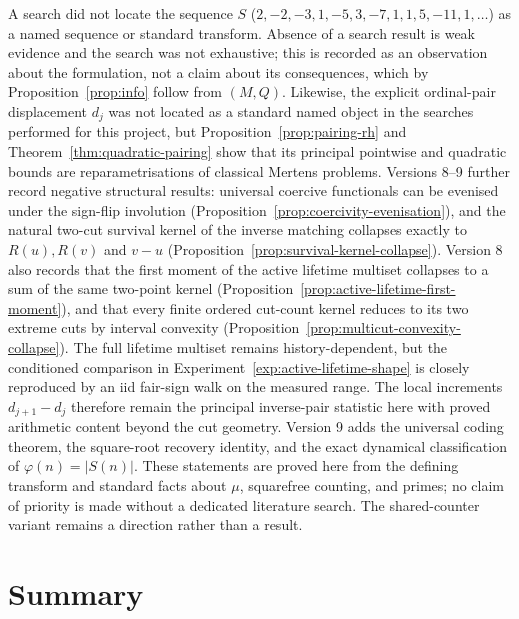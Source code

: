 \documentclass[11pt]{amsart}
\numberwithin{equation}{section}
\theoremstyle{plain}
\theoremstyle{definition}
\theoremstyle{remark}
\newcommand{\Mert}{M}
\newcommand{\Sq}{Q}
\begin{document}
A search did not locate the sequence $S$
($2,-2,-3,1,-5,3,-7,1,1,5,-11,1,\dots$) as a named sequence or standard
transform. Absence of a search result is weak evidence and the search was not
exhaustive; this is recorded as an observation about the formulation, not a
claim about its consequences, which by Proposition~\ref{prop:info} follow from
$(\Mert,\Sq)$.  Likewise, the explicit ordinal-pair displacement $d_j$ was not
located as a standard named object in the searches performed for this project,
but Proposition~\ref{prop:pairing-rh} and Theorem~\ref{thm:quadratic-pairing}
show that its principal pointwise and quadratic bounds are reparametrisations of
classical Mertens problems.  Versions 8--9 further record negative structural
results: universal coercive functionals can be evenised under the sign-flip
involution (Proposition~\ref{prop:coercivity-evenisation}), and the natural
two-cut survival kernel of the inverse matching collapses exactly to
$R(u),R(v)$ and $v-u$ (Proposition~\ref{prop:survival-kernel-collapse}).  Version
8 also records that the first moment of the active lifetime multiset collapses
to a sum of the same two-point kernel
(Proposition~\ref{prop:active-lifetime-first-moment}), and that every finite
ordered cut-count kernel reduces to its two extreme cuts by interval convexity
(Proposition~\ref{prop:multicut-convexity-collapse}).  The full lifetime
multiset remains history-dependent, but the conditioned comparison in
Experiment~\ref{exp:active-lifetime-shape} is closely reproduced by an iid
fair-sign walk on the measured range.  The local increments $d_{j+1}-d_j$
therefore remain the principal inverse-pair statistic here with proved
arithmetic content beyond the cut geometry.  Version 9 adds the universal
coding theorem, the square-root recovery identity, and the exact dynamical
classification of $\varphi(n)=|S(n)|$.  These statements are proved here from
the defining transform and standard facts about $\mu$, squarefree counting,
and primes; no claim of priority is made without a dedicated literature search.
The shared-counter variant remains a direction rather than a result.

\section{Summary}
\label{sec:summary}
\end{document}
